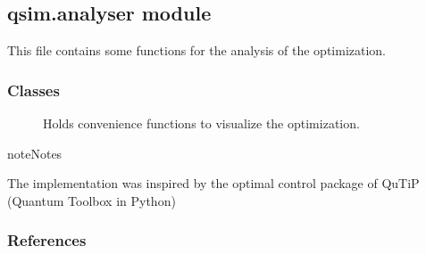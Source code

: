 \documentclass[letterpaper,10pt,english]{sphinxmanual}
\begin{document}
\subsection{qsim.analyser module}
\label{\detokenize{qsim:module-qsim.analyser}}\label{\detokenize{qsim:qsim-analyser-module}}
This file contains some functions for the analysis of the optimization.


\subsubsection{Classes}
\label{\detokenize{qsim:id2}}\begin{description}
\item[{{\hyperref[\detokenize{qsim:qsim.analyser.Analyser}]{}}}] \leavevmode
Holds convenience functions to visualize the optimization.

\end{description}

\begin{sphinxadmonition}{note}{Notes}

The implementation was inspired by the optimal control package of QuTiP 
(Quantum Toolbox in Python)
\end{sphinxadmonition}
\subsubsection*{References}
\end{document}
